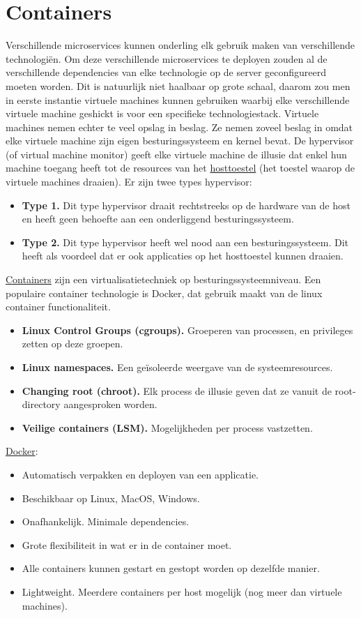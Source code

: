 \documentclass{report}
\begin{document}
	\chapter{Containers}
	Verschillende microservices kunnen onderling elk gebruik maken van verschillende technologiën. Om deze verschillende microservices te deployen zouden al de verschillende dependencies van elke technologie op de server geconfigureerd moeten worden. Dit is natuurlijk niet haalbaar op grote schaal, daarom zou men in eerste instantie virtuele machines kunnen gebruiken waarbij elke verschillende virtuele machine geshickt is voor een specifieke technologiestack. Virtuele machines nemen echter te veel opslag in beslag. Ze nemen zoveel beslag in omdat elke virtuele machine zijn eigen besturingssysteem en kernel bevat. De hypervisor (of virtual machine monitor) geeft elke virtuele machine de illusie dat enkel hun machine toegang heeft tot de resources van het \underline{hosttoestel} (het toestel waarop de virtuele machines draaien). 
	Er zijn twee types hypervisor:
	\begin{itemize}
		\item \textbf{Type 1.} Dit type hypervisor draait rechtstreeks op de hardware van de host en heeft geen behoefte aan een onderliggend besturingssysteem. 
		\item \textbf{Type 2.} Dit type hypervisor heeft wel nood aan een besturingssysteem. Dit heeft als voordeel dat er ook applicaties op het hosttoestel kunnen draaien.
	\end{itemize}
	\underline{Containers} zijn een virtualisatietechniek op besturingssysteemniveau. Een populaire container technologie is Docker, dat gebruik maakt van de linux container functionaliteit.  
	\begin{itemize}
		\item \textbf{Linux Control Groups (cgroups).} Groeperen van processen, en privileges zetten op deze groepen.
		\item \textbf{Linux namespaces.} Een geïsoleerde weergave van de systeemresources.
		\item \textbf{Changing root (chroot).} Elk process de illusie geven dat ze vanuit de root-directory aangesproken worden.
		\item \textbf{Veilige containers (LSM).} Mogelijkheden per process vastzetten.
	\end{itemize}

	\underline{Docker}:
	\begin{itemize}
		\item Automatisch verpakken en deployen van een applicatie.
		\item Beschikbaar op Linux, MacOS, Windows.
		\item Onafhankelijk. Minimale dependencies.
		\item Grote flexibiliteit in wat er in de container moet.
		\item Alle containers kunnen gestart en gestopt worden op dezelfde manier.
		\item Lightweight. Meerdere containers per host mogelijk (nog meer dan virtuele machines).
	\end{itemize}
\end{document}
